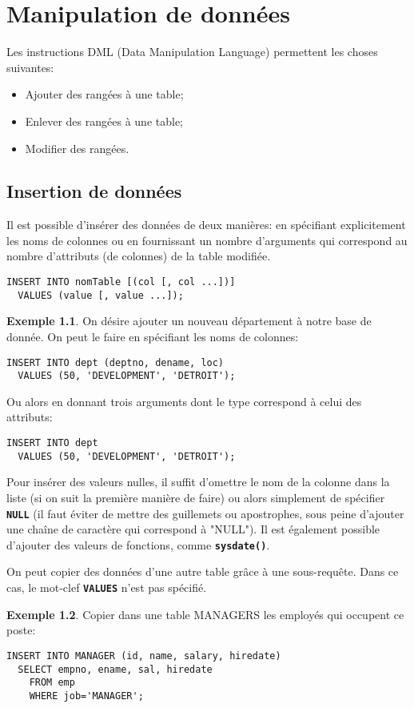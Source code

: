 \documentclass[a4paper, 12pt]{report}
\newcommand{\textSQL}[1]{\texttt{\textbf{#1}}}
\theoremstyle{definition} \newtheorem{ex}{Exemple}
\begin{document}
\chapter{Manipulation de données}
Les instructions DML (Data Manipulation Language) permettent les choses suivantes: \begin{itemize}
\item Ajouter des rangées à une table;
\item Enlever des rangées à une table;
\item Modifier des rangées. \end{itemize}

\section{Insertion de données}
Il est possible d'insérer des données de deux manières: en spécifiant explicitement les noms de colonnes ou en fournissant un nombre d'arguments qui correspond au nombre d'attributs (de colonnes) de la table modifiée.
\begin{lstlisting}[frame=single]
INSERT INTO nomTable [(col [, col ...])]
  VALUES (value [, value ...]);
\end{lstlisting}
\begin{ex}
On désire ajouter un nouveau département à notre base de donnée. On peut le faire en spécifiant les noms de colonnes:
\begin{lstlisting}[frame=single]
INSERT INTO dept (deptno, dename, loc)
  VALUES (50, 'DEVELOPMENT', 'DETROIT');
\end{lstlisting}
Ou alors en donnant trois arguments dont le type correspond à celui des attributs:
\begin{lstlisting}[frame=single]
INSERT INTO dept
  VALUES (50, 'DEVELOPMENT', 'DETROIT');
\end{lstlisting}
\end{ex}
Pour insérer des valeurs nulles, il suffit d'omettre le nom de la colonne dans la liste (si on suit la première manière de faire) ou alors simplement de spécifier \textSQL{NULL} (il faut éviter de mettre des guillemets ou apostrophes, sous peine d'ajouter une chaîne de caractère qui correspond à "NULL"). Il est également possible d'ajouter des valeurs de fonctions, comme \textSQL{sysdate()}.

On peut copier des données d'une autre table grâce à une sous-requête. Dans ce cas, le mot-clef \textSQL{VALUES} n'est pas spécifié.
\begin{ex}
	Copier dans une table MANAGERS les employés qui occupent ce poste:
\begin{lstlisting}[frame=single]
INSERT INTO MANAGER (id, name, salary, hiredate)
  SELECT empno, ename, sal, hiredate
	FROM emp
	WHERE job='MANAGER';
\end{lstlisting}
\end{ex}
\end{document}
